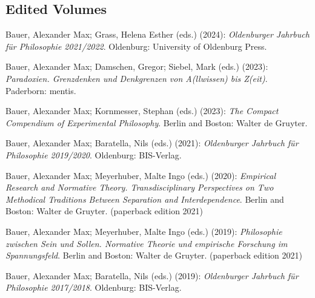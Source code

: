 \documentclass[a4paper,10pt]{article}
\newenvironment{literature}{%
   \parskip6pt\parindent0pt\raggedright
   \def\lititem{\hangindent=1cm\hangafter1}}{%
   \par\ignorespaces}
\begin{document}
\subsection*{Edited Volumes}
\begin{literature}
\lititem Bauer, Alexander Max; Grass, Helena Esther (eds.) (2024): \textit{Oldenburger Jahrbuch für Philosophie 2021/2022}. Oldenburg: University of Oldenburg Press.

\lititem Bauer, Alexander Max; Damschen, Gregor; Siebel, Mark (eds.) (2023): \textit{Paradoxien. Grenzdenken und Denkgrenzen von A(llwissen) bis Z(eit)}. Paderborn: mentis.

\lititem Bauer, Alexander Max; Kornmesser, Stephan (eds.) (2023): \textit{The Compact Compendium of Experimental Philosophy}. Berlin and Boston: Walter de Gruyter.

\lititem Bauer, Alexander Max; Baratella, Nils (eds.) (2021): \textit{Oldenburger Jahrbuch für Philosophie 2019/2020}. Oldenburg: BIS-Verlag.

\lititem Bauer, Alexander Max; Meyerhuber, Malte Ingo (eds.) (2020): \textit{Empirical Research and Normative Theory. Transdisciplinary Perspectives on Two Methodical Traditions Between Separation and Interdependence}. Berlin and Boston: Walter de Gruyter. (paperback edition 2021)

\lititem Bauer, Alexander Max; Meyerhuber, Malte Ingo (eds.) (2019): \textit{Philosophie zwischen Sein und Sollen. Normative Theorie und empirische Forschung im Spannungsfeld}. Berlin and Boston: Walter de Gruyter. (paperback edition 2021)

\lititem Bauer, Alexander Max; Baratella, Nils (eds.) (2019): \textit{Oldenburger Jahrbuch für Philosophie 2017/2018}. Oldenburg: BIS-Verlag.
\end{literature}
\end{document}
